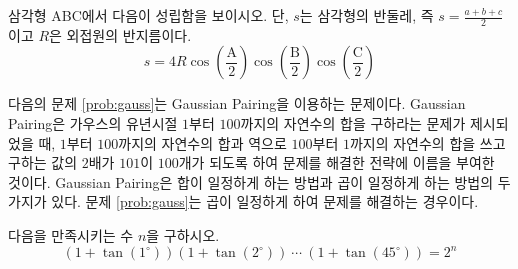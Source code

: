 \documentclass[11pt, a4paper]{book}
\begin{document}
\begin{problem}
	삼각형 \textrm{ABC}에서 다음이 성립함을 보이시오. 단, $s$는 삼각형의 반둘레, 즉 $s=\frac{a+b+c}{2}$이고 $R$은 외접원의 반지름이다.
	\[
	s = 4R \cos\left(\frac{\textrm{A}}{2}\right)\cos\left(\frac{\textrm{B}}{2}\right)\cos\left(\frac{\textrm{C}}{2}\right)
	\]
\end{problem}
\vspace{1em}
다음의 문제 \ref{prob:gauss}는 Gaussian Pairing을 이용하는 문제이다. Gaussian Pairing은 가우스의 유년시절 $1$부터 $100$까지의 자연수의 합을 구하라는 문제가 제시되었을 때, $1$부터 $100$까지의 자연수의 합과 역으로 $100$부터 $1$까지의 자연수의 합을 쓰고 구하는 값의 $2$배가 $101$이 $100$개가 되도록 하여 문제를 해결한 전략에 이름을 부여한 것이다. Gaussian Pairing은 합이 일정하게 하는 방법과 곱이 일정하게 하는 방법의 두 가지가 있다. 문제 \ref{prob:gauss}는 곱이 일정하게 하여 문제를 해결하는 경우이다.
\begin{problem}\label{prob:gauss}
	다음을 만족시키는 수 $n$을 구하시오.
	\begin{equation*}
	\left(1+\tan(1^{\circ})\right)\left(1+\tan(2^{\circ})\right)\: \cdots \: \left(1+\tan(45^{\circ})\right) =2^{n}
	\end{equation*}
\end{problem}
\vspace{1em}
\end{document}
